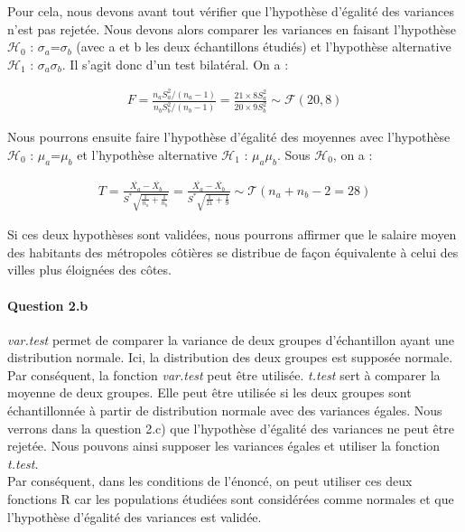 \documentclass[oneside,a4paper,13pt]{book}
\begin{document}
\smallbreak
Pour cela, nous devons avant tout vérifier que l'hypothèse d'égalité des variances n'est pas rejetée. 
Nous devons alors comparer les variances en faisant l'hypothèse $\mathcal{H}_{0}$ : $\sigma_{a}$=$\sigma_{b}$ (avec a et b les deux échantillons étudiés) et l'hypothèse alternative $\mathcal{H}_{1}$ : $\sigma_{a}$\neq$\sigma_{b}$. Il s'agit donc d'un test bilatéral. On a : 

\begin{align*}
    F = \frac{n_{a}S_{a}^{2}/(n_{a}-1)}{n_{b}S_{b}^{2}/(n_{b}-1)}=\frac{21\times8S_{a}^{2}}{20\times9S_{b}^{2}}\sim \mathcal{F}(20,8)
\end{align*}

Nous pourrons ensuite faire l'hypothèse d'égalité des moyennes avec l'hypothèse $\mathcal{H}_{0}$ : $\mu_{a}$=$\mu_{b}$  et l'hypothèse alternative $\mathcal{H}_{1}$ : $\mu_{a}$\neq$\mu_{b}$. Sous $\mathcal{H}_{0}$, on a : 

\begin{align*}
    T = \frac{\overline{X_{a}}-\overline{X_{b}}}{S^{*}\sqrt{\frac{1}{n_{a}}+\frac{1}{n_{b}}}} 
    = \frac{\overline{X_{a}}-\overline{X_{b}}}{S^{*}\sqrt{\frac{1}{21}+\frac{1}{9}}} \sim \mathcal{T}(n_{a}+n_{b}-2=28)
\end{align*}

Si ces deux hypothèses sont validées, nous pourrons affirmer que le salaire moyen des habitants des métropoles côtières se distribue
de façon équivalente à celui des villes plus éloignées des côtes.

\paragraph{Question 2.b}
\textit{var.test} permet de comparer la variance de deux groupes d'échantillon ayant une distribution normale. Ici, la distribution des deux groupes est supposée normale. Par conséquent, la fonction \textit{var.test} peut être utilisée. 
\smallbreak
\textit{t.test} sert à comparer la moyenne de deux groupes. Elle peut être utilisée si les deux groupes sont échantillonnée à partir de distribution normale avec des variances égales. Nous verrons dans la question 2.c) que l'hypothèse d'égalité des variances ne peut être rejetée. Nous pouvons ainsi supposer les variances égales et utiliser la fonction \textit{t.test}.\\
Par conséquent, dans les conditions de l'énoncé, on peut utiliser ces deux fonctions R car les populations étudiées sont considérées comme normales et que l'hypothèse d'égalité des variances est validée. 
\end{document}
